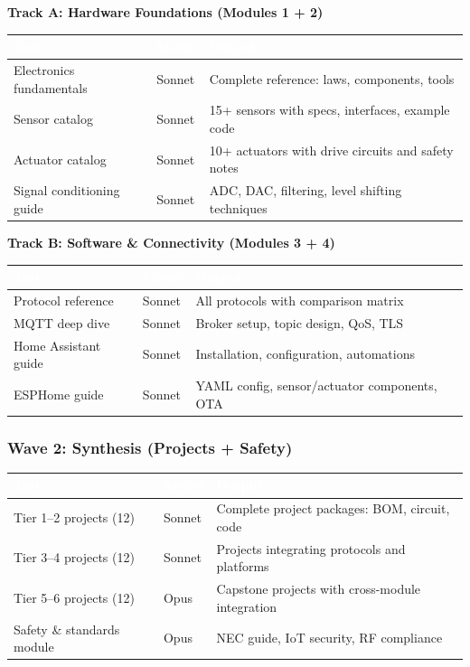 \documentclass[11pt,letterpaper]{article}
\newcommand{\tableheader}[1]{\textbf{\sffamily\textcolor{white}{#1}}}
\begin{document}
\textbf{Track A: Hardware Foundations (Modules 1 + 2)}

\begin{center}
\begin{tabularx}{\textwidth}{L{3.5cm}C{1.5cm}X}
\toprule
{}
\tableheader{Task} & \tableheader{Model} & \tableheader{Output} \\
\midrule
Electronics fundamentals & Sonnet & Complete reference: laws, components, tools \\
Sensor catalog & Sonnet & 15+ sensors with specs, interfaces, example code \\
Actuator catalog & Sonnet & 10+ actuators with drive circuits and safety notes \\
Signal conditioning guide & Sonnet & ADC, DAC, filtering, level shifting techniques \\
\bottomrule
\end{tabularx}
\end{center}

\textbf{Track B: Software \& Connectivity (Modules 3 + 4)}

\begin{center}
\begin{tabularx}{\textwidth}{L{3.5cm}C{1.5cm}X}
\toprule
{}
\tableheader{Task} & \tableheader{Model} & \tableheader{Output} \\
\midrule
Protocol reference & Sonnet & All protocols with comparison matrix \\
MQTT deep dive & Sonnet & Broker setup, topic design, QoS, TLS \\
Home Assistant guide & Sonnet & Installation, configuration, automations \\
ESPHome guide & Sonnet & YAML config, sensor/actuator components, OTA \\
\bottomrule
\end{tabularx}
\end{center}

\subsubsection{Wave 2: Synthesis (Projects + Safety)}

\begin{center}
\begin{tabularx}{\textwidth}{L{3.5cm}C{1.5cm}X}
\toprule
{}
\tableheader{Task} & \tableheader{Model} & \tableheader{Output} \\
\midrule
Tier 1--2 projects (12) & Sonnet & Complete project packages: BOM, circuit, code \\
Tier 3--4 projects (12) & Sonnet & Projects integrating protocols and platforms \\
Tier 5--6 projects (12) & Opus & Capstone projects with cross-module integration \\
Safety \& standards module & Opus & NEC guide, IoT security, RF compliance \\
\bottomrule
\end{tabularx}
\end{center}
\end{document}
